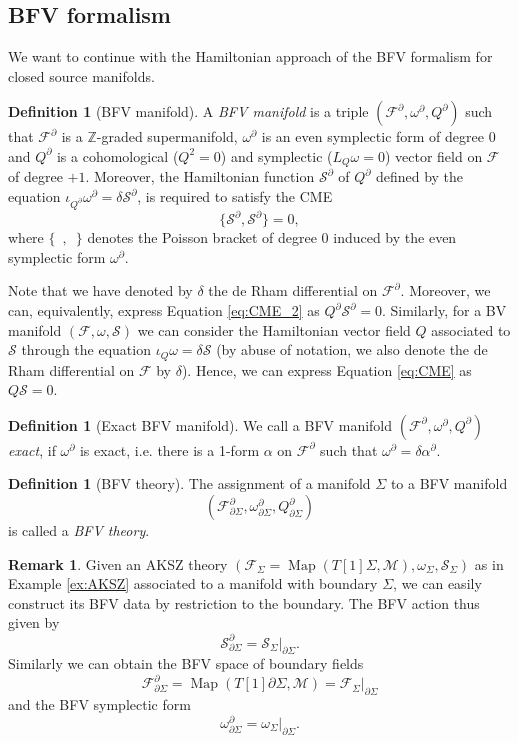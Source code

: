 \documentclass[11pt,colorinlistoftodos]{amsart}
\numberwithin{equation}{subsection}
\theoremstyle{plain}
\theoremstyle{definition}
\newtheorem{defn}[thm]{Definition}
\newtheorem{rem}[thm]{Remark}
\theoremstyle{remark}
\newcommand{\Z}{\mathbb{Z}}
\newcommand{\de}{\partial}
\newcommand{\calS}{\mathcal{S}}
\newcommand{\calM}{\mathcal{M}}
\newcommand{\calF}{\mathcal{F}}
\DeclareMathOperator{\Map}{Map}
\begin{document}
\subsection{BFV formalism}
\label{subsec:BFV_formalism}
We want to continue with the Hamiltonian approach of the BFV formalism for closed source manifolds. 
\begin{defn}[BFV manifold]
A \emph{BFV manifold} is a triple $(\calF^\de,\omega^\de,Q^\de)$ such that $\calF^\de$ is a $\Z$-graded supermanifold, $\omega^\de$ is an even symplectic form of degree 0 and $Q^\de$ is a cohomological ($Q^2=0$) and symplectic ($L_Q\omega=0$) vector field on $\calF$ of degree $+1$. Moreover, the Hamiltonian function $\calS^\de$ of $Q^\de$ defined by the equation $\iota_{Q^\de}\omega^\de=\delta\calS^\de$, is required to satisfy the CME
\begin{equation}
\label{eq:CME_2}
\{\calS^\de,\calS^\de\}=0,
\end{equation}
where $\{\enspace,\enspace\}$ denotes the Poisson bracket of degree 0 induced by the even symplectic form $\omega^\de$.
\end{defn}

Note that we have denoted by $\delta$ the de Rham differential on $\calF^\de$. Moreover, we can, equivalently, express Equation \eqref{eq:CME_2} as $Q^\de\calS^\de=0$. Similarly, for a BV manifold $(\calF,\omega,\calS)$ we can consider the Hamiltonian vector field $Q$ associated to $\calS$ through the equation $\iota_Q\omega=\delta\calS$ (by abuse of notation, we also denote the de Rham differential on $\calF$ by $\delta$). Hence, we can express Equation \eqref{eq:CME} as $Q\calS=0$.


\begin{defn}[Exact BFV manifold]
We call a BFV manifold $(\calF^\de,\omega^\de,Q^\de)$ \emph{exact}, if $\omega^\de$ is exact, i.e. there is a 1-form $\alpha$ on $\calF^\de$ such that $\omega^\de=\delta\alpha^\de$.
\end{defn}

\begin{defn}[BFV theory]
The assignment of a manifold $\Sigma$ to a BFV manifold 
\[
(\calF^\de_{\de\Sigma},\omega^\de_{\de\Sigma},Q^\de_{\de\Sigma})
\]
is called a \emph{BFV theory}.
\end{defn}

\begin{rem}
Given an AKSZ theory $(\calF_\Sigma=\Map(T[1]\Sigma,\calM),\omega_\Sigma,\calS_\Sigma)$ as in Example \ref{ex:AKSZ} associated to a manifold with boundary $\Sigma$, we can easily construct its BFV data by restriction to the boundary. The BFV action thus given by 
\[
\calS^\de_{\de\Sigma}=\calS_\Sigma\big|_{\de\Sigma}.
\]
Similarly we can obtain the BFV space of boundary fields 
\[
\calF^\de_{\de\Sigma}=\Map(T[1]\de\Sigma,\calM)=\calF_{\Sigma}\big|_{\de\Sigma}
\]
and the BFV symplectic form 
\[
\omega^\de_{\de\Sigma}=\omega_\Sigma\big|_{\de\Sigma}.
\]
\end{rem}
\end{document}
